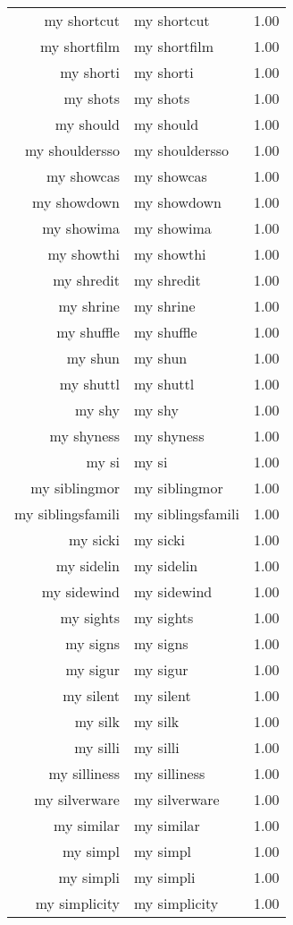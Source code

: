\begin{table}[ht]
\begin{tabular}{rlr}
  my shortcut & my shortcut & 1.00 \\ 
  my shortfilm & my shortfilm & 1.00 \\ 
  my shorti & my shorti & 1.00 \\ 
  my shots & my shots & 1.00 \\ 
  my should & my should & 1.00 \\ 
  my shouldersso & my shouldersso & 1.00 \\ 
  my showcas & my showcas & 1.00 \\ 
  my showdown & my showdown & 1.00 \\ 
  my showima & my showima & 1.00 \\ 
  my showthi & my showthi & 1.00 \\ 
  my shredit & my shredit & 1.00 \\ 
  my shrine & my shrine & 1.00 \\ 
  my shuffle & my shuffle & 1.00 \\ 
  my shun & my shun & 1.00 \\ 
  my shuttl & my shuttl & 1.00 \\ 
  my shy & my shy & 1.00 \\ 
  my shyness & my shyness & 1.00 \\ 
  my si & my si & 1.00 \\ 
  my siblingmor & my siblingmor & 1.00 \\ 
  my siblingsfamili & my siblingsfamili & 1.00 \\ 
  my sicki & my sicki & 1.00 \\ 
  my sidelin & my sidelin & 1.00 \\ 
  my sidewind & my sidewind & 1.00 \\ 
  my sights & my sights & 1.00 \\ 
  my signs & my signs & 1.00 \\ 
  my sigur & my sigur & 1.00 \\ 
  my silent & my silent & 1.00 \\ 
  my silk & my silk & 1.00 \\ 
  my silli & my silli & 1.00 \\ 
  my silliness & my silliness & 1.00 \\ 
  my silverware & my silverware & 1.00 \\ 
  my similar & my similar & 1.00 \\ 
  my simpl & my simpl & 1.00 \\ 
  my simpli & my simpli & 1.00 \\ 
  my simplicity & my simplicity & 1.00 \\ 

\end{tabular}
\end{table}
